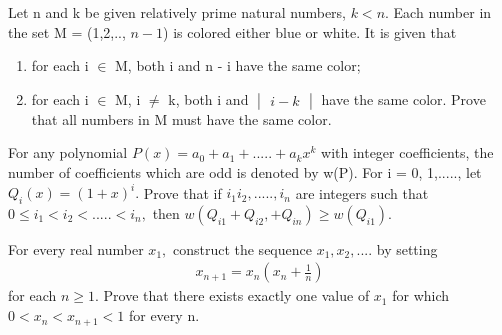 \item Let n and k be given relatively prime natural numbers, $k < n$. Each number in the set M = (1,2,.., $n-1$) is colored either blue or white. It is given that
\begin{enumerate}
\item  for each i $ \in $ M, both i and n - i have the same color;
\item for each i $ \in $ M, i $ \neq $ k, both i and $\begin{vmatrix} i - k \end{vmatrix}$ have the same color. Prove that all numbers in M must have the same color.
\end{enumerate}

\item For any polynomial $P(x) = a_{0} + a_{1} +..... + a_{k}x^{k}$ with integer coefficients, the number of coefficients which are odd is denoted by w(P). For i = 0, 1,....., let $Q_{i}(x) = (1 + x)^{i}.$ Prove that if $i_{1}i_{2},.....,i_{n}$ are integers such that $0 \leq i_{1} < i_{2} < ..... < i_{n},$ then $w(Q_{i1} + Q_{i2}, +  Q_{in}) \geq w(Q_{i1})$.

\item For every real number $x_1,$ construct the sequence $x_1, x_2,$.... by setting
\begin{align*}
x_{n+1} = x_n(x_n + \frac{1}{n})
\end{align*} 
for each $n \geq 1.$
Prove that there exists exactly one value of $x_1$ for which $0 < x_n < x_{n+1} < 1$ for every n.


















